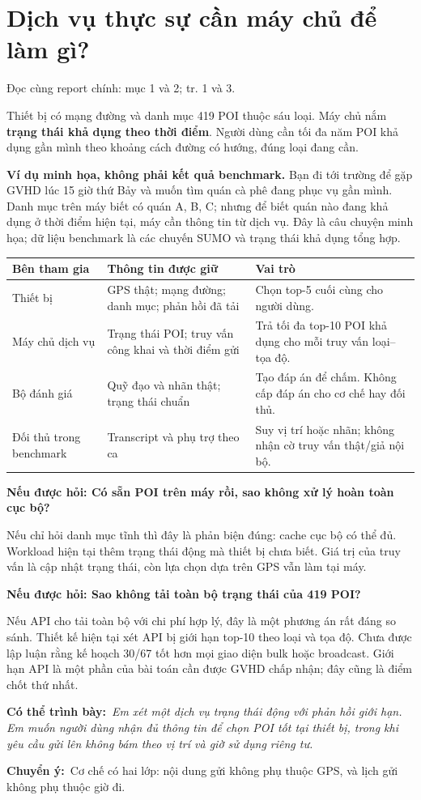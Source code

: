 \documentclass[10pt,a4paper]{article}
\newcommand{\say}[1]{\par\textbf{Có thể trình bày:}\ \textit{#1}\par}
\newcommand{\ask}[2]{\par\textbf{Nếu được hỏi: #1}\par #2\par}
\newcommand{\where}[1]{\par{\small\color{gray}Đọc cùng report chính: #1.}\par}
\newcommand{\transition}[1]{\par\textbf{Chuyển ý:}\ #1\par}
\newcommand{\example}{\textbf{Ví dụ minh họa, không phải kết quả benchmark.} }
\begin{document}
\section{Dịch vụ thực sự cần máy chủ để làm gì?}
\where{mục 1 và 2; tr. 1 và 3}
Thiết bị có mạng đường và danh mục 419 POI thuộc sáu loại. Máy chủ nắm \textbf{trạng thái khả dụng theo thời điểm}. Người dùng cần tối đa năm POI khả dụng gần mình theo khoảng cách đường có hướng, đúng loại đang cần.

\example Bạn đi tới trường để gặp GVHD lúc 15 giờ thứ Bảy và muốn tìm quán cà phê đang phục vụ gần mình. Danh mục trên máy biết có quán A, B, C; nhưng để biết quán nào đang khả dụng ở thời điểm hiện tại, máy cần thông tin từ dịch vụ. Đây là câu chuyện minh họa; dữ liệu benchmark là các chuyến SUMO và trạng thái khả dụng tổng hợp.

\begin{longtable}{@{}P{3.5cm}P{6.0cm}P{6.7cm}@{}}
\toprule Bên tham gia & Thông tin được giữ & Vai trò\\\midrule
Thiết bị & GPS thật; mạng đường; danh mục; phản hồi đã tải & Chọn top-5 cuối cùng cho người dùng.\\[3pt]
Máy chủ dịch vụ & Trạng thái POI; truy vấn công khai và thời điểm gửi & Trả tối đa top-10 POI khả dụng cho mỗi truy vấn loại--tọa độ.\\[3pt]
Bộ đánh giá & Quỹ đạo và nhãn thật; trạng thái chuẩn & Tạo đáp án để chấm. Không cấp đáp án cho cơ chế hay đối thủ.\\[3pt]
Đối thủ trong benchmark & Transcript và phụ trợ theo ca & Suy vị trí hoặc nhãn; không nhận cờ truy vấn thật/giả nội bộ.\\
\bottomrule
\end{longtable}

\ask{Có sẵn POI trên máy rồi, sao không xử lý hoàn toàn cục bộ?}{Nếu chỉ hỏi danh mục tĩnh thì đây là phản biện đúng: cache cục bộ có thể đủ. Workload hiện tại thêm trạng thái động mà thiết bị chưa biết. Giá trị của truy vấn là cập nhật trạng thái, còn lựa chọn dựa trên GPS vẫn làm tại máy.}

\ask{Sao không tải toàn bộ trạng thái của 419 POI?}{Nếu API cho tải toàn bộ với chi phí hợp lý, đây là một phương án rất đáng so sánh. Thiết kế hiện tại xét API bị giới hạn top-10 theo loại và tọa độ. Chưa được lập luận rằng kế hoạch 30/67 tốt hơn mọi giao diện bulk hoặc broadcast. Giới hạn API là một phần của bài toán cần được GVHD chấp nhận; đây cũng là điểm chốt thứ nhất.}

\say{Em xét một dịch vụ trạng thái động với phản hồi giới hạn. Em muốn người dùng nhận đủ thông tin để chọn POI tốt tại thiết bị, trong khi yêu cầu gửi lên không bám theo vị trí và giờ sử dụng riêng tư.}
\transition{Cơ chế có hai lớp: nội dung gửi không phụ thuộc GPS, và lịch gửi không phụ thuộc giờ đi.}
\end{document}
